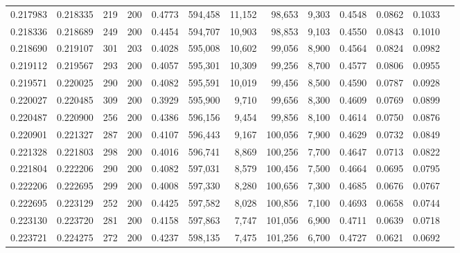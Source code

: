 \begin{tabular}{rrrrrrrrrrrrr}
0.217983 & 0.218335 &   219 & 200 &                                     0.4773 & 594,458 &  11,152 &  98,653 &   9,303 & 0.4548 & 0.0862 & 0.1033 \\
0.218336 & 0.218689 &   249 & 200 &                                     0.4454 & 594,707 &  10,903 &  98,853 &   9,103 & 0.4550 & 0.0843 & 0.1010 \\
0.218690 & 0.219107 &   301 & 203 &                                     0.4028 & 595,008 &  10,602 &  99,056 &   8,900 & 0.4564 & 0.0824 & 0.0982 \\
0.219112 & 0.219567 &   293 & 200 &                                     0.4057 & 595,301 &  10,309 &  99,256 &   8,700 & 0.4577 & 0.0806 & 0.0955 \\
0.219571 & 0.220025 &   290 & 200 &                                     0.4082 & 595,591 &  10,019 &  99,456 &   8,500 & 0.4590 & 0.0787 & 0.0928 \\
0.220027 & 0.220485 &   309 & 200 &                                     0.3929 & 595,900 &   9,710 &  99,656 &   8,300 & 0.4609 & 0.0769 & 0.0899 \\
0.220487 & 0.220900 &   256 & 200 &                                     0.4386 & 596,156 &   9,454 &  99,856 &   8,100 & 0.4614 & 0.0750 & 0.0876 \\
0.220901 & 0.221327 &   287 & 200 &                                     0.4107 & 596,443 &   9,167 & 100,056 &   7,900 & 0.4629 & 0.0732 & 0.0849 \\
0.221328 & 0.221803 &   298 & 200 &                                     0.4016 & 596,741 &   8,869 & 100,256 &   7,700 & 0.4647 & 0.0713 & 0.0822 \\
0.221804 & 0.222206 &   290 & 200 &                                     0.4082 & 597,031 &   8,579 & 100,456 &   7,500 & 0.4664 & 0.0695 & 0.0795 \\
0.222206 & 0.222695 &   299 & 200 &                                     0.4008 & 597,330 &   8,280 & 100,656 &   7,300 & 0.4685 & 0.0676 & 0.0767 \\
0.222695 & 0.223129 &   252 & 200 &                                     0.4425 & 597,582 &   8,028 & 100,856 &   7,100 & 0.4693 & 0.0658 & 0.0744 \\
0.223130 & 0.223720 &   281 & 200 &                                     0.4158 & 597,863 &   7,747 & 101,056 &   6,900 & 0.4711 & 0.0639 & 0.0718 \\
0.223721 & 0.224275 &   272 & 200 &                                     0.4237 & 598,135 &   7,475 & 101,256 &   6,700 & 0.4727 & 0.0621 & 0.0692 \\

\end{tabular}
